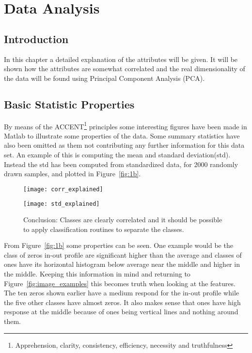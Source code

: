 \chapter{Data Analysis}

\section{Introduction}
In this chapter a detailed explanation of the attributes will be given. It will be shown how the attributes are somewhat correlated and the real dimensionality of the data will be found using Principal Component Analysis (PCA). 

\section{Basic Statistic Properties}
By means of the ACCENT\footnote{Apprehension, clarity, consistency, efficiency, necessity and truthfulness} principles some interesting figures have been made in Matlab to illustrate some properties of the data. Some summary statistics have also been omitted as them not contributing any further information for this data set. An example of this is computing the mean and standard deviation(std). Instead the std has been computed from standardized data, for 2000 randomly drawn samples, and plotted in Figure~\ref{fig:1b}. 
 
\begin{figure}[H]
\begin{minipage}[t]{.49\linewidth}
\centering
\texttt{[image: corr\_explained]}
\end{minipage}%
\hfill%
\begin{minipage}[t]{.49\linewidth}
\centering
\texttt{[image: std\_explained]}
\end{minipage}
\caption{Conclusion: Classes are clearly correlated and it should be possible to apply classification routines to separate the classes. }
\end{figure}

From Figure~\ref{fig:1b} some properties can be seen. One example would be the class of zeros in-out profile are significant higher than the average and classes of ones have its horizontal histogram below average near the middle and higher in the middle. Keeping this information in mind and returning to Figure~\ref{fig:image_examples} this becomes truth when looking at the features. The ten zeros shown earlier have a medium respond for the in-out profile while the five other classes have almost zeros. It also makes sense that ones have high response at the middle because of ones being vertical lines and nothing around them.

